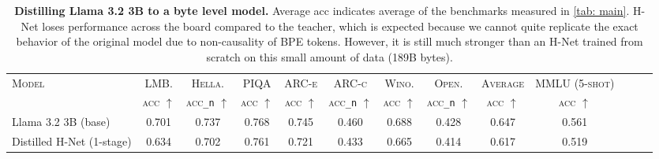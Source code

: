 \begin{table}[t!]
\caption{
\textbf{Distilling Llama 3.2 3B to a byte level model.} Average acc indicates average of the benchmarks measured in \cref{tab: main}. 
H-Net loses performance across the board compared to the teacher, which is expected because we cannot quite replicate the exact behavior of the original model due to non-causality of BPE tokens.
However, it is still much stronger than an H-Net trained from scratch on this small amount of data (189B bytes).
}
\centering
\small
{ 
\begin{tabular}{lcccccccccccc} 
\toprule
\multirow{2}{*}{\textsc{Model}} & \textsc{LMB.} & \textsc{Hella.} & \textsc{PIQA} & \textsc{ARC-e} & \textsc{ARC-c} & \textsc{Wino.} & \textsc{Open.} & \textsc{Average} & \textsc{MMLU (5-shot)}\\
& \textsc{acc} $\uparrow$ & \textsc{acc}\texttt{\_n} $\uparrow$ & \textsc{acc} $\uparrow$ & \textsc{acc} $\uparrow$ & \textsc{acc}\texttt{\_n} $\uparrow$ & \textsc{acc} $\uparrow$ & \textsc{acc}\texttt{\_n} $\uparrow$ & \textsc{acc} $\uparrow$ & \textsc{acc} $\uparrow$ \\
\midrule
Llama 3.2 3B (base) & 0.701 & 0.737 & 0.768 & 0.745 & 0.460 & 0.688 & 0.428 & 0.647 & 0.561 \\
Distilled H-Net (1-stage) & 0.634 & 0.702 & 0.761 & 0.721 & 0.433 & 0.665 & 0.414 & 0.617 & 0.519 \\
\bottomrule
\end{tabular}
} 
\label{tab: distill}
\end{table}
